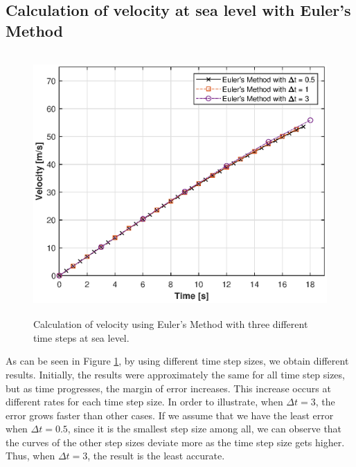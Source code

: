 \documentclass[letterpaper,12pt]{article}
\begin{document}
\subsection{Calculation of velocity at sea level with Euler's Method }
\begin{figure}[ht]
\centering \includegraphics[max height=10cm]{graphs/question1.eps}
\caption{Calculation of velocity using Euler's Method with three different time steps at sea level.}
     \label{fig:q1}
\end{figure}

As can be seen in Figure \ref{fig:q1}, by using different time step sizes, we obtain different results.
Initially, the results were approximately the same for all time step sizes, but as time progresses, the margin of error increases.
This increase occurs at different rates for each time step size. In order to illustrate, when $ \Delta t = 3 $, the
error grows faster than other cases. If we assume that we have the least error when $ \Delta t = 0.5 $, since it is
the smallest step size among all, we can observe that the curves of the other step sizes deviate more as the time step size gets
higher. Thus, when $ \Delta t = 3 $, the result is the least accurate.
\end{document}
